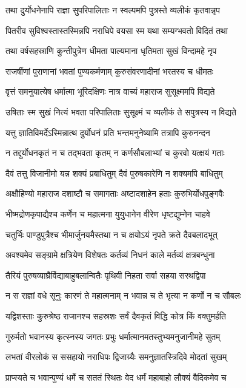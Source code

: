 \threelineshloka
{तथा दुर्योधनेनापि राज्ञा सुपरिपालिताः}
{न स्वल्पमपि पुत्रस्ते व्यलीकं कृतवान्नृप}
{}


\twolineshloka
{पितरीव सुविश्वस्तास्तस्मिन्नपि नराधिपे}
{वयसा स्म यथा सम्यग्भवतो विदितं तथा}


\twolineshloka
{तथा वर्षसहस्राणि कुन्तीपुत्रेण धीमता}
{पाल्यमाना धृतिमता सुखं विन्दामहे नृप}


\twolineshloka
{राजर्षीणां पुराणानां भवतां पुण्यकर्मणाम्}
{कुरुसंवरणादीनां भरतस्य च धीमतः}


\twolineshloka
{वृत्तं समनुयात्येष धर्मात्मा भूरिदक्षिणः}
{नात्र वाच्यं महाराज सुसूक्ष्ममपि विद्यते}


\twolineshloka
{उषिताः स्म सुखं नित्यं भवता परिपालिताः}
{सुसूक्ष्मं च व्यलीकं ते सपुत्रस्य न विद्यते}


\twolineshloka
{यत्तु ज्ञातिविमर्देऽस्मिन्नात्थ दुर्योधनं प्रति}
{भन्तमनुनेष्यामि तत्रापि कुरुनन्दन}


\twolineshloka
{न तद्दुर्योधनकृतं न च तद्भवता कृतम्}
{न कर्णसौबलाभ्यां च कुरवो यत्क्षयं गताः}


\twolineshloka
{दैवं तत्तु विजानीमो यन्न शक्यं प्रबाधितुम्}
{दैवं पुरुषकारेणि न शक्यमपि बाधितुम्}


\twolineshloka
{अक्षौहिण्यो महाराज दशाष्टौ च समागताः}
{अष्टादशाहेन हताः कुरुभिर्योधपुङ्गवैः}


\twolineshloka
{भीष्मद्रोणकृपाद्यैश्च कर्णेन च महात्मना}
{युयुधानेन वीरेण धृष्टद्युम्नेन चाहवे}


\twolineshloka
{चतुर्भिः पाण्डुपुत्रैश्च भीमार्जुनयमैस्तथा}
{न च क्षयोऽयं नृपते क्रते दैवबलादभूत्}


\twolineshloka
{अवश्यमेव सङ्ग्रामे क्षत्रियेण विशेषतः}
{कर्तव्यं निधनं काले मर्तव्यं क्षत्रबन्धुना}


\twolineshloka
{तैरियं पुरुषव्याघ्रैर्विद्याबाहुबलान्वितैः}
{पृथिवी निहता सर्वा सहया सरथद्विपा}


\twolineshloka
{न स राज्ञां वधे सूनुः कारणं ते महात्मनाम्}
{न भवान्न च ते भृत्या न कर्णो न च सौबलः}


\twolineshloka
{यद्विशस्ताः कुरुश्रेष्ठ राजानश्च सहस्रशः}
{सर्वं दैवकृतं विद्धि कोत्र किं वक्तुमर्हति}


\twolineshloka
{गुरुर्मतो भवानस्य कृत्स्नस्य जगतः प्रभुः}
{धर्मात्मानमतस्तुभ्यमनुजानीमहे सुतम्}


\threelineshloka
{लभतां वीरलोकं स ससहायो नराधिपः}
{द्विजाग्र्यैः समनुज्ञातस्त्रिदिवे मोदतां सुखम्}
{}


\twolineshloka
{प्राप्स्यते च भवान्पुण्यं धर्मे च सततं स्थितः}
{वेद धर्मं महाबाहो लौक्यं वैदिकमेव च}


